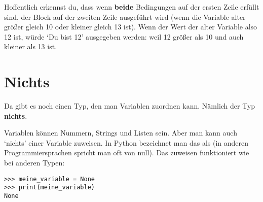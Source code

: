 Hoffentlich erkennst du, dass wenn \textbf{beide} Bedingungen auf der ersten Zeile erfüllt sind, der Block auf der zweiten Zeile ausgeführt wird (wenn die Variable alter größer gleich 10 oder kleiner gleich 13 ist). Wenn der Wert der alter Variable also 12 ist, würde `Du bist 12' ausgegeben werden: weil 12 größer als 10 und auch kleiner als 13 ist.

\section{Nichts}

Da gibt es noch einen Typ, den man Variablen zuordnen kann. Nämlich der Typ \textbf{nichts}.
\par
Variablen können Nummern, Strings und Listen sein. Aber man kann auch `nichts' einer Variable zuweisen. In Python bezeichnet man das als  (in anderen Programmiersprachen spricht man oft von null). Das zuweisen funktioniert wie bei anderen Typen:

\begin{Verbatim}[frame=single]
>>> meine_variable = None
>>> print(meine_variable)
None
\end{Verbatim}

